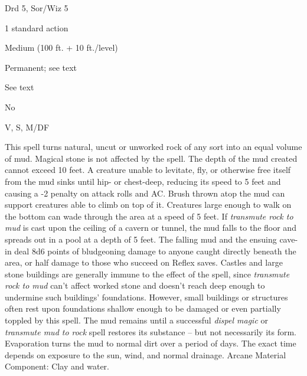 
\begin{description*}
\item[Level:] Drd 5, Sor/Wiz 5
\item[Casting Time:] 1 standard action
\item[Range:] Medium (100 ft. + 10 ft./level)
\item[Duration:] Permanent; see text
\item[Saving Throw:] See text
\item[Spell Resistance:] No
\item[Components:] V, S, M/DF
\end{description*}

This spell turns natural, uncut or unworked rock of any sort into an equal volume
of mud. Magical stone is not affected by the spell. The depth of the mud created
cannot exceed 10 feet. A creature unable to levitate, fly, or otherwise free itself
from the mud sinks until hip- or chest-deep, reducing its speed to 5 feet and causing
a -2 penalty on attack rolls and AC. Brush thrown atop the mud can support creatures
able to climb on top of it. Creatures large enough to walk on the bottom can wade
through the area at a speed of 5 feet.
If \textit{transmute rock to mud} is cast upon the ceiling of a cavern or tunnel,
the mud falls to the floor and spreads out in a pool at a depth of 5 feet. The
falling mud and the ensuing cave-in deal 8d6 points of bludgeoning damage to anyone
caught directly beneath the area, or half damage to those who succeed on Reflex
saves.
Castles and large stone buildings are generally immune to the effect of the spell,
since \textit{transmute rock to mud} can't affect worked stone and doesn't reach
deep enough to undermine such buildings' foundations. However, small buildings
or structures often rest upon foundations shallow enough to be damaged or even
partially toppled by this spell.
The mud remains until a successful \textit{dispel magic} or \textit{transmute mud
to rock} spell restores its substance -- but not necessarily its form. Evaporation
turns the mud to normal dirt over a period of days. The exact time depends on exposure
to the sun, wind, and normal drainage.
Arcane Material Component: Clay and water.